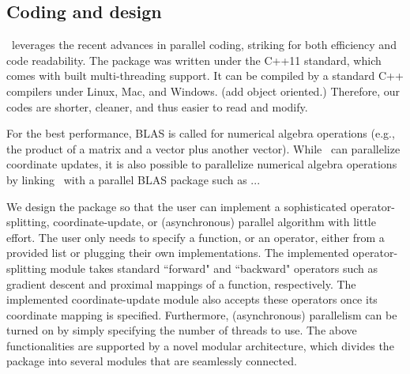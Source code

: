 \subsection{Coding and design}
\pkg~leverages the recent advances in parallel coding, striking for both efficiency and code readability. The package was written under the C++11 standard, which comes with built multi-threading support. It can be compiled by  a  standard C++ compilers  under Linux, Mac, and Windows. (add object oriented.) %
Therefore, our codes  are shorter, cleaner, and thus easier to read and modify. 

For the best performance, BLAS is called for numerical algebra operations (e.g., the product of a matrix and a vector plus another vector). While \pkg~can parallelize coordinate updates, it is also possible to parallelize numerical algebra operations by linking \pkg~with a parallel BLAS package such as ...  

We design the package so that the user can implement a sophisticated operator-splitting, coordinate-update, or (asynchronous) parallel algorithm  with little effort. The user only needs to specify a function, or an operator, either from a provided list or plugging their own implementations. The implemented operator-splitting module takes standard ``forward" and ``backward" operators such as gradient descent and proximal mappings of a function, respectively. The implemented coordinate-update module also accepts these  operators once its coordinate mapping is specified. Furthermore, (asynchronous) parallelism can be turned on by simply specifying the number of threads to use.
The above functionalities are supported by a  novel modular architecture, which divides the package into several modules that are seamlessly connected.   

 

